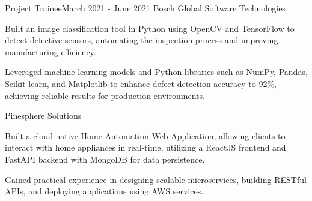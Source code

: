     \resumeSubheading
		{Project Trainee}{March 2021 - June 2021}
		{Bosch Global Software Technologies}{}
		\resumeItemListStart
        \item Built an image classification tool in Python using OpenCV and TensorFlow to detect defective sensors, automating the inspection process and improving manufacturing efficiency.
        \item Leveraged machine learning models and Python libraries such as NumPy, Pandas, Scikit-learn, and Matplotlib to enhance defect detection accuracy to 92\%, achieving reliable results for production environments.
	\resumeItemListEnd
\vspace{-1pt}

   {Pinesphere Solutions} {}
    \resumeItemListStart                
          {
    \item Built a cloud-native Home Automation Web Application, allowing clients to interact with home appliances in real-time, utilizing a ReactJS frontend and FastAPI backend with MongoDB for data persistence.
  \item Gained practical experience in designing scalable microservices, building RESTful APIs, and deploying applications using AWS services.
  }
\resumeItemListEnd

\resumeSubHeadingListEnd
\vspace{5pt}

